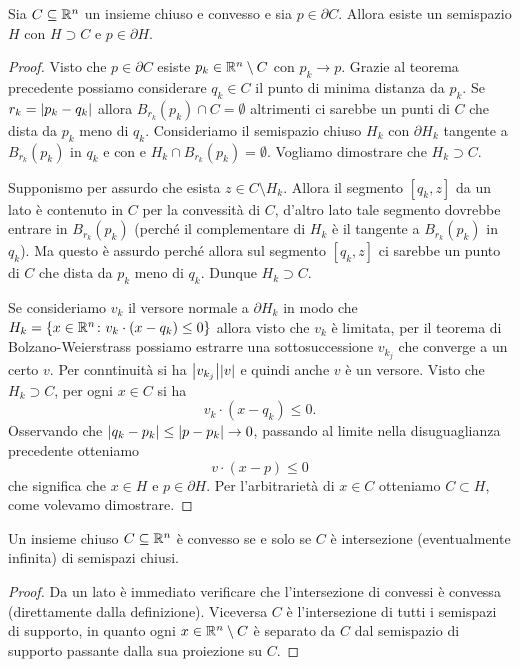 \begin{theorem}
  Sia $C\subseteq {\mathbb R}^n$ un insieme chiuso e convesso e sia $p\in \partial C$.
  Allora esiste un semispazio $H$ con $H\supset C$ e $p\in \partial H$.
\end{theorem}
\begin{proof}
Visto che $p\in \partial C$ esiste $p_k\in {\mathbb R}^n\setminus C$ con $p_k \to p$.
Grazie al teorema precedente possiamo considerare $q_k\in C$
il punto di minima distanza da $p_k$.
Se $r_k = {\left|p_k - q_k\right|}$ allora 
$B_{r_k}(p_k) \cap C = \emptyset$ 
altrimenti ci sarebbe un punti di $C$ che dista da $p_k$ meno di $q_k$.
Consideriamo il semispazio chiuso $H_k$ con $\partial H_k$
tangente a $B_{r_k}(p_k)$ in $q_k$ e con
e $H_k \cap B_{r_k}(p_k) = \emptyset$.
Vogliamo dimostrare che $H_k \supset C$.

Supponismo per assurdo che esista $z\in C \setminus H_k$.
Allora il segmento $[q_k,z]$ da un lato è contenuto in $C$ 
per la convessità di $C$, d'altro lato
tale segmento dovrebbe entrare in $B_{r_k}(p_k)$  
(perché il complementare di $H_k$ è il tangente a $B_{r_k}(p_k)$ in $q_k$).
Ma questo è assurdo perché allora sul segmento $[q_k,z]$ ci sarebbe un punto di $C$ che dista da $p_k$ meno di $q_k$.
Dunque $H_k \supset C$.

Se consideriamo $v_k$ il versore normale a $\partial H_k$ in modo 
che $H_k = {\left\{ x\in {\mathbb R}^n\colon v_k\cdot (x-q_k) \le 0 \right\}}$
allora visto che $v_k$ è limitata, 
per il teorema di Bolzano-Weierstrass 
possiamo estrarre una sottosuccessione $v_{k_j}$ che converge a
un certo $v$. 
Per conntinuità si ha ${\left|v_{k_j}\right|} {\left|v\right|}$ 
e quindi anche $v$ è un versore.
Visto che $H_k \supset C$, per ogni $x\in C$ si ha 
\[
  v_k \cdot (x-q_k)\le 0.
\]
Osservando che ${\left|q_k - p_k\right|} \le {\left|p-p_k\right|} \to 0$,
passando al limite nella disuguaglianza precedente otteniamo
\[
  v \cdot (x-p) \le 0
\]
che significa che $x\in H$ e $p\in \partial H$.
Per l'arbitrarietà di $x\in C$ otteniamo $C\subset H$, 
come volevamo dimostrare.
\end{proof}

\begin{corollary}
Un insieme chiuso $C\subseteq {\mathbb R}^n$ è convesso 
se e solo se $C$ è intersezione (eventualmente infinita) 
di semispazi chiusi.
\end{corollary}
\begin{proof}
Da un lato è immediato verificare che l'intersezione di convessi 
è convessa (direttamente dalla definizione).
Viceversa $C$ è l'intersezione di tutti i semispazi di 
supporto, in quanto ogni $x\in {\mathbb R}^n\setminus C$ è separato da $C$ 
dal semispazio di supporto passante dalla sua proiezione su $C$.
\end{proof}


